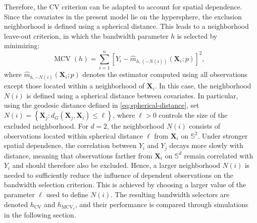 \documentclass[12pt]{report} %
\newcommand{\bX}{\mathbf{X}}
\begin{document}
Therefore, the CV criterion can be adapted to account for spatial dependence. Since the covariates in the present model lie on the hypersphere, the exclusion neighborhood is defined using a spherical distance. This leads to a neighborhood leave-out criterion, in which the bandwidth parameter $h$ is selected by minimizing: 
\begin{equation}
\label{eq:sph-mcv-neighborhood}
\operatorname{MCV}(h)
=\sum_{i=1}^{n} \left[ Y_i-\hat{m}_{h,(-N(i))}(\bX_i;p) \right]^2,
\end{equation}
where $\hat{m}_{h,-N(i)}(\bX_i;p)$ denotes the estimator computed using all observations except those located within a neighborhood of $\bX_i$. In this case, the neighborhood $N(i)$ is defined using a spherical distance between covariates. In particular, using the geodesic distance defined in \eqref{eq:spherical-distance}, set $N(i) = \left\{ \bX_j:d_{G}(\bX_j,\bX_i)\leq \ell \right\}$,  where $\ell>0$ controls the size of the excluded neighborhood. For $d=2$, the neighborhood $N(i)$ consists of observations located within spherical distance $\ell$ from $\bX_i$ on $\mathbb{S}^2$.  Under stronger spatial dependence, the correlation between $Y_i$ and $Y_j$ decays more slowly with distance, meaning that observations farther from $\bX_i$ on $\mathbb{S}^d$ remain correlated with $Y_i$ and should therefore also be excluded. Hence, a larger neighborhood $N(i)$ is needed to sufficiently reduce the influence of dependent observations on the bandwidth selection criterion. This is achieved by choosing a larger value of the parameter $\ell$ used to define $N(i)$. The resulting bandwidth selectors are denoted $h_{\mathrm{CV}}$ and $h_{\mathrm{MCV}_\ell}$, and their performance is compared through simulations in the following section.





\end{document}
